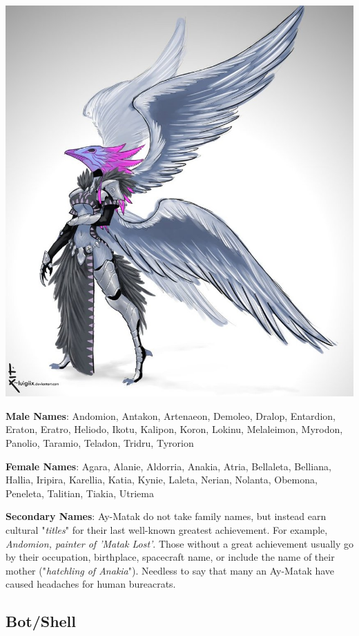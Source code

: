 \documentclass[10pt,twoside]{article}
\begin{document}
\begin{multicols}{2}
  \includegraphics[width=\linewidth]{bird_race_f_concept_by_luigiix-d52w3as}
  
  \textbf{Male Names}: Andomion, Antakon, Artenaeon, Demoleo, Dralop, Entardion, Eraton, Eratro, Heliodo, Ikotu, Kalipon, Koron, Lokinu, Melaleimon, Myrodon, Panolio, Taramio, Teladon, Tridru, Tyrorion
  
  \textbf{Female Names}: Agara, Alanie, Aldorria, Anakia, Atria, Bellaleta, Belliana, Hallia, Iripira, Karellia, Katia, Kynie, Laleta, Nerian, Nolanta, Obemona, Peneleta, Talitian, Tiakia, Utriema
  
  \textbf{Secondary Names}: Ay-Matak do not take family names, but instead earn cultural "\textit{titles}" for their last well-known greatest achievement. For example, \textit{Andomion, painter of 'Matak Lost'}. Those without a great achievement usually go by their occupation, birthplace, spacecraft name, or include the name of their mother ("\textit{hatchling of Anakia}"). Needless to say that many an Ay-Matak have caused headaches for human bureacrats.
  
  \columnbreak

  \subsection{Bot/Shell}
  

\end{multicols}
\end{document}
